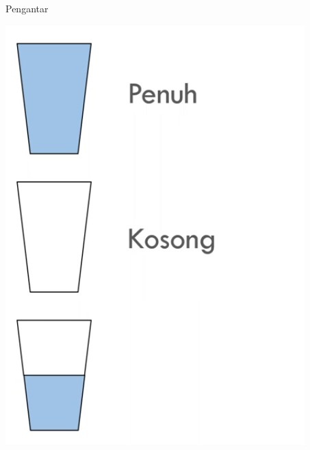 \documentclass[pdflatex,compress,mathserif]{beamer}
\begin{document}
\begin{frame}{Pengantar}
	\begin{center}
		\includegraphics[height=0.7\textheight]{img/03}
	\end{center}
\end{frame}
\end{document}
